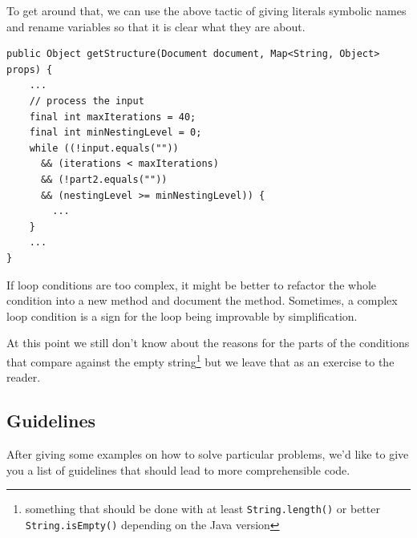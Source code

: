 \documentclass[12pt]{book}
\begin{document}
To get around that, we can use the above tactic of giving literals symbolic names and rename variables so that it is clear what they are about.

\begin{lstlisting}[caption=selfdoc4a.java] 
public Object getStructure(Document document, Map<String, Object> props) {
    ...
    // process the input
    final int maxIterations = 40;
    final int minNestingLevel = 0;
    while ((!input.equals("")) 
      && (iterations < maxIterations) 
      && (!part2.equals("")) 
      && (nestingLevel >= minNestingLevel)) {
        ...
    }
    ...
}
\end{lstlisting}

If loop conditions are too complex, it might be better to refactor the whole condition into a new method and document the method. Sometimes, a complex loop condition is a sign for the loop being improvable by simplification.

At this point we still don't know about the reasons for the parts of the conditions that compare against the empty string\footnote{something that should be done with at least {\tt String.length()} or better {\tt String.isEmpty()} depending on the Java version} but we leave that as an exercise to the reader.



\subsection{Guidelines}

After giving some examples on how to solve particular problems, we'd like to give you a list of guidelines that should lead to more comprehensible code.
\end{document}
